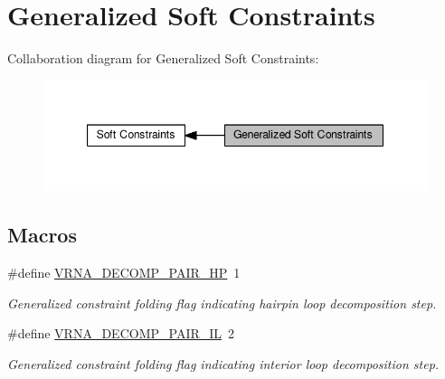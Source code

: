 \hypertarget{group__generalized__sc}{}\section{Generalized Soft Constraints}
\label{group__generalized__sc}
Collaboration diagram for Generalized Soft Constraints\+:
\nopagebreak
\begin{figure}[H]
\begin{center}
\leavevmode
\includegraphics[width=347pt]{group__generalized__sc}
\end{center}
\end{figure}
\subsection*{Macros}
\begin{DoxyCompactItemize}
\item 
\hypertarget{group__generalized__sc_ga8bd41ebc8039378d242e4e8c273716a5}{}\#define \hyperlink{group__generalized__sc_ga8bd41ebc8039378d242e4e8c273716a5}{V\+R\+N\+A\+\_\+\+D\+E\+C\+O\+M\+P\+\_\+\+P\+A\+I\+R\+\_\+\+H\+P}~1\label{group__generalized__sc_ga8bd41ebc8039378d242e4e8c273716a5}

\begin{DoxyCompactList}\small\item\em Generalized constraint folding flag indicating hairpin loop decomposition step. \end{DoxyCompactList}\item 
\hypertarget{group__generalized__sc_gaeab04f34d7730cff2d651d782f95d857}{}\#define \hyperlink{group__generalized__sc_gaeab04f34d7730cff2d651d782f95d857}{V\+R\+N\+A\+\_\+\+D\+E\+C\+O\+M\+P\+\_\+\+P\+A\+I\+R\+\_\+\+I\+L}~2\label{group__generalized__sc_gaeab04f34d7730cff2d651d782f95d857}

\begin{DoxyCompactList}\small\item\em Generalized constraint folding flag indicating interior loop decomposition step. \end{DoxyCompactList}\end{DoxyCompactItemize}
